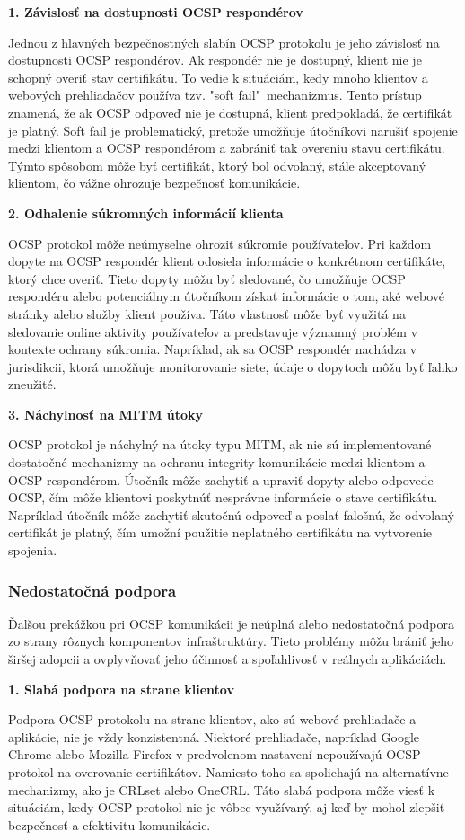 \documentclass[12pt, twoside]{book}
\newcommand{\subsubsubsection}[1]{%
  \vspace{0.2em}  
  \textbf{#1} \\[0.2em]
  \hspace*{\parindent}
}
\begin{document}
\subsubsubsection{1. Závislosť na dostupnosti OCSP respondérov}
Jednou z hlavných bezpečnostných slabín OCSP protokolu je jeho závislosť na dostupnosti OCSP respondérov. Ak respondér nie je dostupný, klient nie je schopný overiť stav certifikátu. To vedie k situáciám, kedy mnoho klientov a webových prehliadačov používa tzv. "soft fail"\ mechanizmus. Tento prístup znamená, že ak OCSP odpoveď nie je dostupná, klient predpokladá, že certifikát je platný. Soft fail je problematický, pretože umožňuje útočníkovi narušiť spojenie medzi klientom a OCSP respondérom a zabrániť tak overeniu stavu certifikátu. Týmto spôsobom môže byť certifikát, ktorý bol odvolaný, stále akceptovaný klientom, čo vážne ohrozuje bezpečnosť komunikácie.

\subsubsubsection{2. Odhalenie súkromných informácií klienta}
OCSP protokol môže neúmyselne ohroziť súkromie používateľov. Pri každom dopyte na OCSP respondér klient odosiela informácie o konkrétnom certifikáte, ktorý chce overiť. Tieto dopyty môžu byť sledované, čo umožňuje OCSP respondéru alebo potenciálnym útočníkom získať informácie o tom, aké webové stránky alebo služby klient používa. Táto vlastnosť môže byť využitá na sledovanie online aktivity používateľov a predstavuje významný problém v kontexte ochrany súkromia. Napríklad, ak sa OCSP respondér nachádza v jurisdikcii, ktorá umožňuje monitorovanie siete, údaje o dopytoch môžu byť ľahko zneužité.

\subsubsubsection{3. Náchylnosť na MITM útoky}
OCSP protokol je náchylný na útoky typu MITM, ak nie sú implementované dostatočné mechanizmy na ochranu integrity komunikácie medzi klientom a OCSP respondérom. Útočník môže zachytiť a upraviť dopyty alebo odpovede OCSP, čím môže klientovi poskytnúť nesprávne informácie o stave certifikátu. Napríklad útočník môže zachytiť skutočnú odpoveď a poslať falošnú, že odvolaný certifikát je platný, čím umožní použitie neplatného certifikátu na vytvorenie spojenia. 

\subsubsection{Nedostatočná podpora}
Ďalšou prekážkou pri OCSP komunikácii je neúplná alebo nedostatočná podpora zo strany rôznych komponentov infraštruktúry. Tieto problémy môžu brániť jeho širšej adopcii a ovplyvňovať jeho účinnosť a spoľahlivosť v reálnych aplikáciách.


\subsubsubsection{1. Slabá podpora na strane klientov}
Podpora OCSP protokolu na strane klientov, ako sú webové prehliadače a aplikácie, nie je vždy konzistentná. Niektoré prehliadače, napríklad Google Chrome alebo Mozilla  Firefox v predvolenom nastavení nepoužívajú OCSP protokol na overovanie certifikátov. Namiesto toho sa spoliehajú na alternatívne mechanizmy, ako je CRLset alebo OneCRL.\cite{turin} Táto slabá podpora môže viesť k situáciám, kedy OCSP protokol nie je vôbec využívaný, aj keď by mohol zlepšiť bezpečnosť a efektivitu komunikácie.
\end{document}

